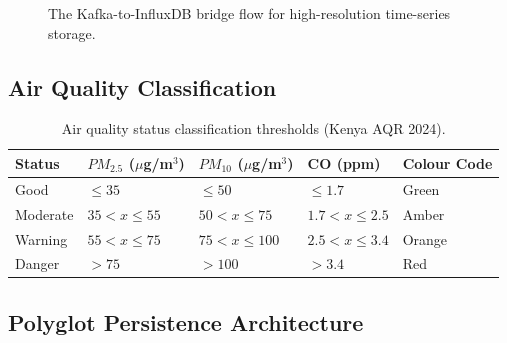 \documentclass[12pt,a4paper]{article}
\begin{document}
\begin{figure}[H]
\centering
{}
\caption{The Kafka-to-InfluxDB bridge flow for high-resolution time-series storage.}
\label{fig:kafka_bridge}
\end{figure}

\subsection{Air Quality Classification}

\begin{table}[H]
\centering
\caption{Air quality status classification thresholds (Kenya AQR 2024).}
\label{tab:aqi}
\begin{tabular}{@{}lllll@{}}
\toprule
\textbf{Status} & \textbf{$PM_{2.5}$ ($\mu$g/m$^3$)} & \textbf{$PM_{10}$ ($\mu$g/m$^3$)} & \textbf{CO (ppm)} & \textbf{Colour Code} \\
\midrule
Good & $\leq 35$ & $\leq 50$ & $\leq 1.7$ & Green \\
Moderate & $35 < x \leq 55$ & $50 < x \leq 75$ & $1.7 < x \leq 2.5$ & Amber \\
Warning & $55 < x \leq 75$ & $75 < x \leq 100$ & $2.5 < x \leq 3.4$ & Orange \\
Danger & $> 75$ & $> 100$ & $> 3.4$ & Red \\
\bottomrule
\end{tabular}
\end{table}

\subsection{Polyglot Persistence Architecture}
\end{document}
